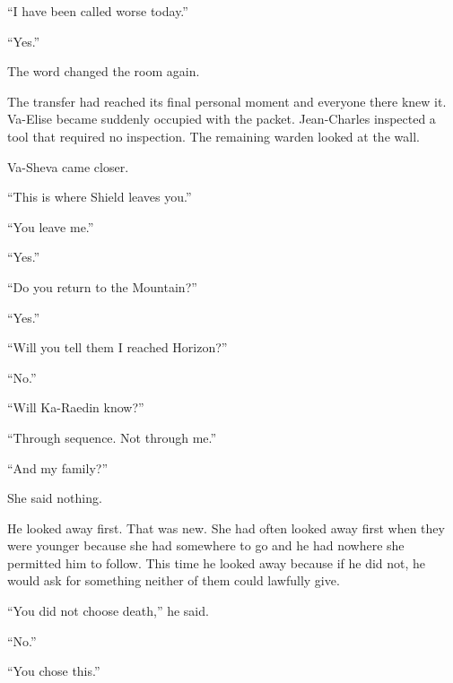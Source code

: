 “I have been called worse today.”\par

“Yes.”\par

The word changed the room again.\par

The transfer had reached its final personal moment and everyone there knew it. Va-Elise became suddenly occupied with the packet. Jean-Charles inspected a tool that required no inspection. The remaining warden looked at the wall.\par

Va-Sheva came closer.\par

“This is where Shield leaves you.”\par

“You leave me.”\par

“Yes.”\par

“Do you return to the Mountain?”\par

“Yes.”\par

“Will you tell them I reached Horizon?”\par

“No.”\par

“Will Ka-Raedin know?”\par

“Through sequence. Not through me.”\par

“And my family?”\par

She said nothing.\par

He looked away first. That was new. She had often looked away first when they were younger because she had somewhere to go and he had nowhere she permitted him to follow. This time he looked away because if he did not, he would ask for something neither of them could lawfully give.\par

“You did not choose death,” he said.\par

“No.”\par

“You chose this.”\par

